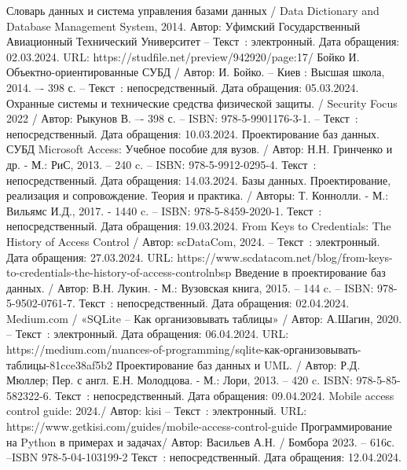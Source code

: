 
\begin{thebibliography}{9}
	
	Словарь данных и система управления базами данных / Data Dictionary and Database Management System, 2014.  Автор: Уфимский Государственный Авиационный Технический Университет  – Текст~: электронный. Дата обращения: 02.03.2024. URL: https://studfile.net/preview/942920/page:17/ 
	Бойко И. Объектно-ориентированные СУБД / Автор: И. Бойко. – Киев : Высшая школа, 2014. –- 398 с. -- Текст~: непосредственный. Дата обращения: 05.03.2024. 
	Охранные системы и технические средства физической защиты.  /  Security Focus 2022 / Автор: Рыкунов В. –- 398 с. – ISBN: 978-5-9901176-3-1. – Текст~: непосредственный. Дата обращения: 10.03.2024.
	Проектирование баз данных. СУБД Microsoft Access: Учебное пособие для вузов. / Автор: Н.Н. Гринченко и др. - М.: РиС, 2013. -- 240 c. -- ISBN: 978-5-9912-0295-4.  Текст~: непосредственный. Дата обращения: 14.03.2024.
	Базы данных. Проектирование, реализация и сопровождение. Теория и практика. / Авторы: Т. Коннолли. - М.: Вильямс И.Д., 2017. - 1440 c. -- ISBN:  978-5-8459-2020-1. Текст~: непосредственный. Дата обращения: 19.03.2024.
	From Keys to Credentials: The History of Access Control / Автор: scDataCom, 2024. – Текст~: электронный. Дата обращения: 27.03.2024. URL: https://www.scdatacom.net/blog/from-keys-to-credentials-the-history-of-access-controlnbsp
	Введение в проектирование баз данных. / Автор: В.Н. Лукин. - М.: Вузовская книга, 2015. -- 144 c. -- ISBN: 978-5-9502-0761-7. Текст~: непосредственный. Дата обращения: 02.04.2024.	
	Medium.com / «SQLite – Как организовывать таблицы» / Автор: А.Шагин, 2020. – Текст~: электронный. Дата обращения: 06.04.2024. URL: https://medium.com/nuances-of-programming/sqlite-как-организовывать-таблицы-81cce38af5b2
	Проектирование баз данных и UML. / Автор: Р.Д. Мюллер; Пер. с англ. Е.Н. Молодцова. - М.: Лори, 2013. -- 420 c. ISBN: 978-5-85-582322-6. Текст~: непосредственный. Дата обращения: 09.04.2024.
	Mobile access control guide: 2024./ Автор: kisi  – Текст~: электронный. URL: https://www.getkisi.com/guides/mobile-access-control-guide
	 Программирование на Python в примерах и задачах/ Автор: Васильев А.Н. / Бомбора 2023. -- 616с. --ISBN 978-5-04-103199-2 Текст~: непосредственный. Дата обращения: 12.04.2024.

\end{thebibliography}
